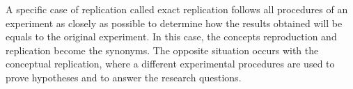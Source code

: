 A specific case of replication called exact replication \cite{exp04} follows all procedures of an experiment as closely as possible to determine how the results obtained will be equals to the original experiment. In this case, the concepts reproduction and replication become the synonyms. The opposite situation occurs with the conceptual replication, where a different experimental procedures are used to prove hypotheses and to answer the research questions. 














